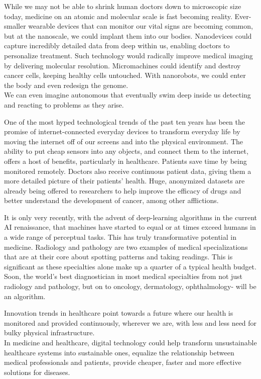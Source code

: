 \documentclass[12pt]{article}
\begin{document}
\indent
While we may not be able to shrink human doctors down to microscopic size today, medicine on an atomic and molecular scale is fast becoming reality. Ever-smaller wearable devices that can monitor our vital signs are becoming common, but at the nanoscale, we could implant them into our bodies. Nanodevices could capture incredibly detailed data from deep within us, enabling doctors to personalize treatment. Such technology would radically improve medical imaging by delivering molecular resolution. Micromachines could identify and destroy cancer cells, keeping healthy cells untouched. With nanorobots, we could enter the body and even redesign the genome. 
\\
We can even imagine autonomous that eventually swim deep inside us detecting and reacting to problems as they arise.

\indent
One of the most hyped technological trends of the past ten years has been the promise of internet-connected everyday devices to transform everyday life by moving the internet off of our screens and into the physical environment. The ability to put cheap sensors into any objects, and connect them to the internet, offers a host of benefits, particularly in healthcare. Patients save time by being monitored remotely.  Doctors also receive continuous patient data, giving them a more detailed picture of their patients’ health.
Huge, anonymized datasets are already being offered to researchers to help improve the efficacy of drugs and better understand the development of cancer, among other afflictions. 

\indent
It is only very recently, with the advent of deep-learning algorithms in the current AI renaissance, that machines have started to equal or at times exceed humans in a wide range of perceptual tasks. This has truly transformative potential in medicine.
Radiology and pathology are two examples of medical specializations that are at their core about spotting patterns and taking readings. This is significant as these specialties alone make up a quarter of a typical health budget. Soon, the world’s best diagnostician in most medical specialties from not just radiology and pathology, but on to oncology, dermatology, ophthalmology- will be an algorithm.

\indent
Innovation trends in healthcare point towards a future where our health is monitored and provided continuously, wherever we are, with less and less need for bulky physical infrastructure.
\\
In medicine and healthcare, digital technology could help transform unsustainable healthcare systems into sustainable ones, equalize the relationship between medical professionals and patients, provide cheaper, faster and more effective solutions for diseases.
\end{document}
